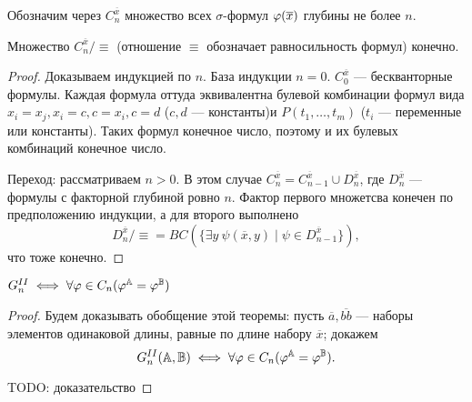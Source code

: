\begin{definition}
    Обозначим через $C_n^{\overline{x}}$ множество всех $\sigma$-формул $\varphi(\overline{x})$ глубины не более $n$.
\end{definition}

\begin{prop}
    Множество $C_n^{\overline x}/{\equiv}$ (отношение $\equiv$ обозначает равносильность формул) конечно.
\end{prop}

\begin{proof}
    Доказываем индукцией по $n$. База индукции $n=0$. $C_0^{\overline{x}}$ — бескванторные формулы. Каждая формула оттуда эквивалентна булевой комбинации формул вида $x_i=x_j, x_i=c, c=x_i, c=d$ ($c, d$ — константы)и $P(t_1, \dots, t_m)$ ($t_i$ — переменные или константы). Таких формул конечное число, поэтому и их булевых комбинаций конечное число.

    Переход: рассматриваем $n>0$. В этом случае $C_n^{\overline{x}} = C_{n-1}^{\overline{x}}\cup D_n^{\overline{x}}$, где $D_n^{\overline{x}}$ — формулы с факторной глубиной ровно $n$. Фактор первого множетсва конечен по предположению индукции, а для второго выполнено
    $$D_n^{\overline{x}}/{\equiv} = BC(\{\exists y~\psi(\overline{x}, y)\mid \psi\in D_{n-1}^{\overline{x}}\}),$$
    что тоже конечно. %
\end{proof}

\begin{theorem}
    $G_n^{II} \iff \forall \varphi\in C_n (\varphi^{\mathbb A} = \varphi^{\mathbb B})$
\end{theorem}
\begin{proof}
    Будем доказывать обобщение этой теоремы: пусть $\overline{a}, \overline{bb}$ — наборы элементов одинаковой длины, равные по длине набору $\overline{x}$; докажем
    $$G_n^{II}({\mathbb A}, {\mathbb B}) \iff \forall \varphi\in C_n (\varphi^{\mathbb A}=\varphi^{\mathbb B}).$$

    TODO: доказательство
\end{proof}

